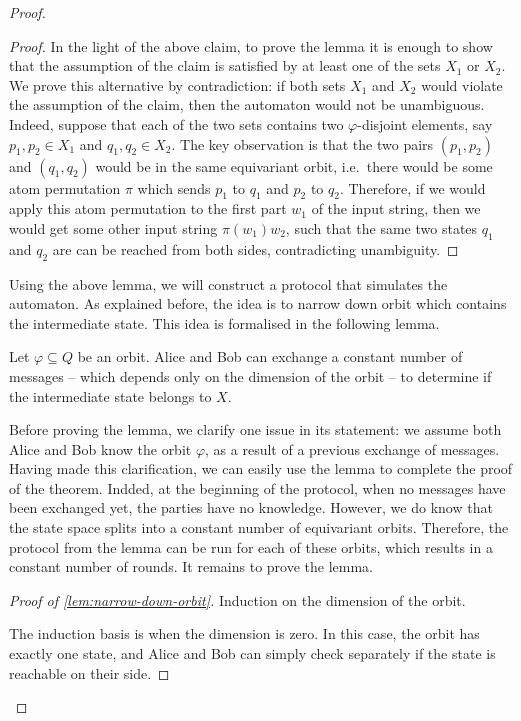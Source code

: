\begin{proof}
\begin{proof}
        In the light of the above claim, to prove the lemma it is enough to show that the assumption of the claim is satisfied by at least one of the sets $X_1$ or $X_2$. We prove this alternative by contradiction: if both sets $X_1$ and $X_2$ would violate the assumption of the claim, then the automaton would not be unambiguous. 
        Indeed, suppose that each of the two sets contains two $\varphi$-disjoint elements, say $p_1,p_2 \in X_1$ and $q_1,q_2 \in X_2$. The key observation is that the two pairs $(p_1,p_2)$ and $(q_1,q_2)$ would be  in the same equivariant orbit, i.e.~there would be some atom permutation $\pi$ which sends $p_1$ to $q_1$ and $p_2$ to $q_2$. Therefore, if we would  apply this atom permutation to the first part $w_1$ of the input string, then we would get some other input string $\pi(w_1) w_2$, such that  the same two states $q_1$ and $q_2$ are can be reached from both sides, contradicting  unambiguity.     \end{proof}


        Using the above lemma, we will construct a protocol that simulates the automaton. As explained before, the idea is to narrow down orbit which contains the intermediate state. This idea is formalised in the following lemma. 


\begin{lemma}\label{lem:narrow-down-orbit}
    Let $\varphi \subseteq Q$ be an orbit. Alice and Bob can exchange a constant number of messages -- which depends only on the dimension of the orbit --  to determine if the intermediate state belongs to $X$. 
\end{lemma}

Before proving the lemma, we clarify one issue in its statement:  we assume both Alice and Bob know the orbit $\varphi$, as a result of a previous exchange of messages. Having made this clarification, we can easily use the lemma to complete the proof of the theorem. Indded, at the beginning of the protocol, when no messages have been exchanged yet, the parties have no knowledge. However, we do know that the state space splits into a constant number of equivariant orbits. Therefore, the protocol from the lemma can be run for each of these orbits, which results in a constant number of rounds. It remains to prove the lemma. 


\begin{proof}[Proof of \cref{lem:narrow-down-orbit}]
Induction on the  {dimension} of the orbit.  
    
    The induction basis is when the  dimension is zero. In this case, the orbit has exactly one state, and Alice and Bob can simply check separately if the state is reachable on their side.


\end{proof}
\end{proof}
